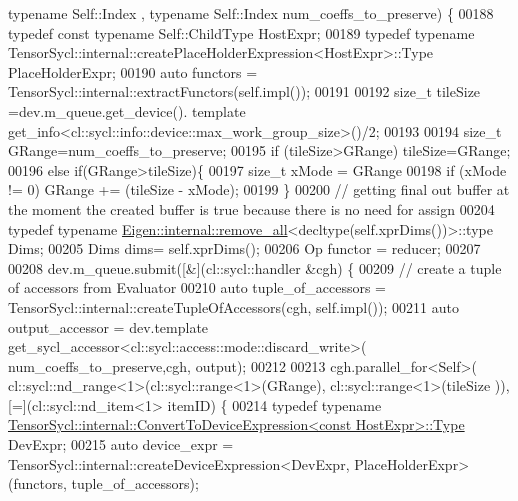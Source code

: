 \begin{DoxyCode}
{      typename} Self::Index , \textcolor{keyword}{typename} Self::Index num\_coeffs\_to\_preserve) \{
00188     \textcolor{keyword}{typedef} \textcolor{keyword}{const} \textcolor{keyword}{typename} Self::ChildType HostExpr; 
00189     \textcolor{keyword}{typedef}  \textcolor{keyword}{typename} TensorSycl::internal::createPlaceHolderExpression<HostExpr>::Type PlaceHolderExpr;
00190     \textcolor{keyword}{auto} functors = TensorSycl::internal::extractFunctors(\textcolor{keyword}{self}.impl());
00191 
00192     \textcolor{keywordtype}{size\_t} tileSize =dev.m\_queue.get\_device(). \textcolor{keyword}{template} 
      get\_info<cl::sycl::info::device::max\_work\_group\_size>()/2;
00193 
00194     \textcolor{keywordtype}{size\_t} GRange=num\_coeffs\_to\_preserve;
00195     \textcolor{keywordflow}{if} (tileSize>GRange) tileSize=GRange;
00196     \textcolor{keywordflow}{else} \textcolor{keywordflow}{if}(GRange>tileSize)\{
00197       \textcolor{keywordtype}{size\_t} xMode = GRange %
00198       \textcolor{keywordflow}{if} (xMode != 0) GRange += (tileSize - xMode);
00199     \}
00200     \textcolor{comment}{// getting final out buffer at the moment the created buffer is true because there is no need for
       assign}
00204 \textcolor{comment}{}    \textcolor{keyword}{typedef} \textcolor{keyword}{typename} \hyperlink{struct_eigen_1_1internal_1_1remove__all}{Eigen::internal::remove\_all}<decltype(\textcolor{keyword}{self}.xprDims())>::type
       Dims;
00205     Dims dims= \textcolor{keyword}{self}.xprDims();
00206     Op functor = reducer;
00207 
00208     dev.m\_queue.submit([&](cl::sycl::handler &cgh) \{
00209       \textcolor{comment}{// create a tuple of accessors from Evaluator}
00210       \textcolor{keyword}{auto} tuple\_of\_accessors =  TensorSycl::internal::createTupleOfAccessors(cgh, \textcolor{keyword}{self}.impl());
00211       \textcolor{keyword}{auto} output\_accessor = dev.template get\_sycl\_accessor<cl::sycl::access::mode::discard\_write>(
      num\_coeffs\_to\_preserve,cgh, output);
00212 
00213       cgh.parallel\_for<Self>( cl::sycl::nd\_range<1>(cl::sycl::range<1>(GRange), cl::sycl::range<1>(tileSize
      )), [=](cl::sycl::nd\_item<1> itemID) \{
00214         \textcolor{keyword}{typedef} \textcolor{keyword}{typename} 
      \hyperlink{struct_eigen_1_1_tensor_sycl_1_1internal_1_1_convert_to_device_expression}{TensorSycl::internal::ConvertToDeviceExpression<const HostExpr>::Type}
       DevExpr;
00215         \textcolor{keyword}{auto} device\_expr = TensorSycl::internal::createDeviceExpression<DevExpr, PlaceHolderExpr>(functors,
       tuple\_of\_accessors);

\end{DoxyCode}
